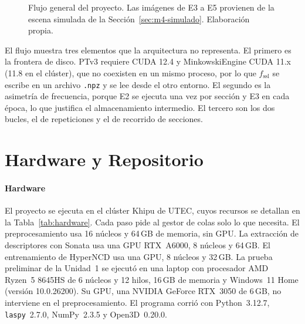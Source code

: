 \begin{figure}[!htbp]
\caption[Flujo general del proyecto]{Flujo general del proyecto. Las imágenes de E3 a E5 provienen de la escena simulada de la Sección~\ref{sec:m4-simulado}. Elaboración propia.}
\label{fig:flujo}
\end{figure}

El flujo muestra tres elementos que la arquitectura no representa. El primero es
la frontera de disco. PTv3 requiere CUDA 12.4 y MinkowskiEngine CUDA 11.x (11.8 en el
clúster), que no coexisten en un mismo proceso, por lo que $f_{\mathrm{ssl}}$ se escribe en
un archivo \texttt{.npz} y se lee desde el otro entorno. El segundo es la
asimetría de frecuencia, porque E2 se ejecuta una vez por sección y E3 en cada época,
lo que justifica el almacenamiento intermedio. El tercero son los dos bucles, el
de repeticiones y el de recorrido de secciones.

\FloatBarrier
\section{Hardware y Repositorio}
\label{sec:hardware-repo}

\paragraph*{Hardware}
El proyecto se ejecuta en el clúster Khipu de UTEC, cuyos recursos se detallan
en la Tabla~\ref{tab:hardware}. Cada paso pide al gestor de colas solo lo que
necesita. El preprocesamiento usa 16 núcleos y 64\,GB de memoria, sin GPU. La
extracción de descriptores con Sonata usa una GPU RTX~A6000, 8 núcleos y
64\,GB. El entrenamiento de HyperNCD usa una GPU, 8 núcleos y 32\,GB. La prueba
preliminar de la Unidad~1 se ejecutó en una laptop con procesador AMD Ryzen~5
8645HS de 6 núcleos y 12 hilos, 16\,GB de memoria y Windows~11 Home
(versión 10.0.26200). Su GPU, una NVIDIA GeForce RTX~3050 de 6\,GB, no interviene
en el preprocesamiento. El programa corrió con Python~3.12.7, \texttt{laspy}~2.7.0,
NumPy~2.3.5 y Open3D~0.20.0.

